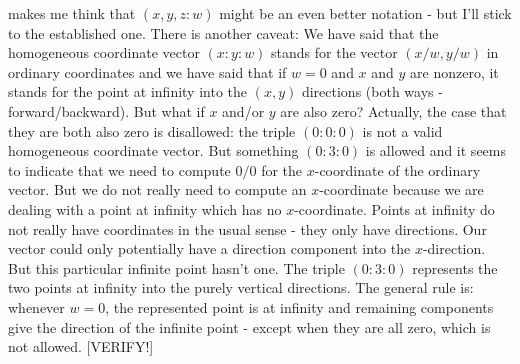 makes me think that $(x,y,z : w)$ might be an even better notation - but I'll stick to the established one. There is another caveat: We have said that the homogeneous coordinate vector $(x : y : w)$ stands for the vector $(x/w, y/w)$ in ordinary coordinates and we have said that if $w=0$ and $x$ and $y$ are nonzero, it stands for the point at infinity into the $(x,y)$ directions (both ways - forward/backward). But what if $x$ and/or $y$ are also zero? Actually, the case that they are both also zero is disallowed: the triple $(0:0:0)$ is not a valid homogeneous coordinate vector. But something $(0:3:0)$ is allowed and it seems to indicate that we need to compute $0/0$ for the $x$-coordinate of the ordinary vector. But we do not really need to compute an $x$-coordinate because we are dealing with a point at infinity which has no $x$-coordinate. Points at infinity do not really have coordinates in the usual sense - they only have directions. Our vector could only potentially have a direction component into the $x$-direction. But this particular infinite point hasn't one. The triple $(0:3:0)$ represents the two points at infinity into the purely vertical directions. The general rule is: whenever $w=0$, the represented point is at infinity and remaining components give the direction of the infinite point - except when they are all zero, which is not allowed. [VERIFY!]








